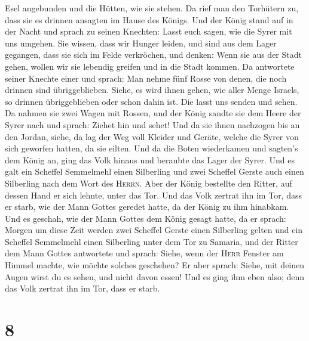 Esel angebunden und die Hütten, wie sie stehen.  Da rief
man den Torhütern zu, dass sie es drinnen ansagten im Hause des Königs.
 Und der König stand auf in der Nacht und sprach zu
seinen Knechten: Lasst euch sagen, wie die Syrer mit uns umgehen. Sie
wissen, dass wir Hunger leiden, und sind aus dem Lager gegangen, dass
sie sich im Felde verkröchen, und denken: Wenn sie aus der Stadt gehen,
wollen wir sie lebendig greifen und in die Stadt kommen. 
Da antwortete seiner Knechte einer und sprach: Man nehme fünf Rosse von
denen, die noch drinnen sind übriggeblieben. Siehe, es wird ihnen gehen,
wie aller Menge Israels, so drinnen übriggeblieben oder schon dahin ist.
Die lasst uns senden und sehen.  Da nahmen sie zwei Wagen
mit Rossen, und der König sandte sie dem Heere der Syrer nach und
sprach: Ziehet hin und sehet!  Und da sie ihnen nachzogen
bis an den Jordan, siehe, da lag der Weg voll Kleider und Geräte, welche
die Syrer von sich geworfen hatten, da sie eilten. Und da die Boten
wiederkamen und sagten's dem König an,  ging das Volk
hinaus und beraubte das Lager der Syrer. Und es galt ein Scheffel
Semmelmehl einen Silberling und zwei Scheffel Gerste auch einen
Silberling nach dem Wort des \textsc{Herrn}.  Aber der
König bestellte den Ritter, auf dessen Hand er sich lehnte, unter das
Tor. Und das Volk zertrat ihn im Tor, dass er starb, wie der Mann Gottes
geredet hatte, da der König zu ihm hinabkam.  Und es
geschah, wie der Mann Gottes dem König gesagt hatte, da er sprach:
Morgen um diese Zeit werden zwei Scheffel Gerste einen Silberling gelten
und ein Scheffel Semmelmehl einen Silberling unter dem Tor zu Samaria,
 und der Ritter dem Mann Gottes antwortete und sprach:
Siehe, wenn der \textsc{Herr} Fenster am Himmel machte, wie möchte
solches geschehen? Er aber sprach: Siehe, mit deinen Augen wirst du es
sehen, und nicht davon essen!  Und es ging ihm eben also;
denn das Volk zertrat ihn im Tor, dass er starb.

\hypertarget{section-7}{%
\section{8}\label{section-7}}

